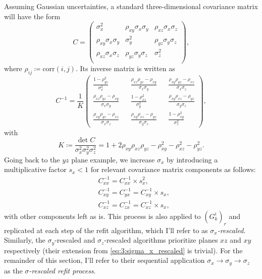 Assuming Gaussian uncertainties, a standard three-dimensional covariance matrix will have the form
\begin{equation}
C = \begin{pmatrix}
	\sigma_x^2 & \rho_{xy} \sigma_x \sigma_y & \rho_{xz} \sigma_x \sigma_z \\
	\rho_{xy} \sigma_x \sigma_y & \sigma_y^2 & \rho_{yz} \sigma_y \sigma_z \\
	\rho_{xz} \sigma_x \sigma_z & \rho_{yz} \sigma_y \sigma_z & \sigma_z^2 \\
\end{pmatrix},
\label{eq:3:gaussian_covmatrix}
\end{equation}
where $\rho_{ij} \coloneqq \text{corr}(i,j)$. Its inverse matrix is written as
\begin{equation}
C^{-1} = \frac{1}{K} \begin{pmatrix}
\frac{1-\rho_{yz}^2}{\sigma_x^2} &&
\frac{\rho_{xz}\rho_{yz} - \rho_{xy}}{\sigma_x \sigma_y} &&
\frac{\rho_{xy}\rho_{yz} - \rho_{xz}}{\sigma_x \sigma_z} \\
\frac{\rho_{xz}\rho_{yz} - \rho_{xy}}{\sigma_x \sigma_y} &&
\frac{1-\rho_{xz}^2}{\sigma_y^2} &&
\frac{\rho_{xy}\rho_{xz} - \rho_{yz}}{\sigma_y \sigma_z} \\
\frac{\rho_{xy}\rho_{yz} - \rho_{xz}}{\sigma_x \sigma_z} &&
\frac{\rho_{xy}\rho_{xz} - \rho_{yz}}{\sigma_y \sigma_z} &&
\frac{1-\rho_{xy}^2}{\sigma_z^2}
\end{pmatrix},
\label{eq:3:inverse_gaussian_covmatrix}
\end{equation}
with
\begin{equation}
K \coloneqq \frac{\det C}{\sigma_x^2 \sigma_y^2 \sigma_z^2} = 1+2\rho_{xy} \rho_{xz} \rho_{yz} - \rho_{xy}^2 - \rho_{xz}^2 - \rho_{yz}^2.
\end{equation}
Going back to the $yz$ plane example, we increase $\sigma_x$ by introducing a multiplicative factor $s_x < 1$ for relevant covariance matrix components as follows:
\begin{equation}
\begin{aligned}
&C^{-1}_{xx} = C^{-1}_{xx} \times s_x^2, \\
&C^{-1}_{xy} = C^{-1}_{yx} = C^{-1}_{xy} \times s_x, \\
&C^{-1}_{xz} = C^{-1}_{zx} = C^{-1}_{xz} \times s_x,
\end{aligned}
\label{eq:3:sigma_x_rescaled}
\end{equation}
with other components left as is.
This process is also applied to ${(G_k^i)}_r$ and replicated at each step of the refit algorithm, which I'll refer to as \textit{$\sigma_x$-rescaled}.
Similarly, the $\sigma_y$-rescaled and $\sigma_z$-rescaled algorithms prioritize planes $xz$ and $xy$ respectively (their extension from \eqref{eq:3:sigma_x_rescaled} is trivial).
For the remainder of this section, I'll refer to their sequential application $\sigma_x \rightarrow \sigma_y \rightarrow \sigma_z$ as the \textit{$\sigma$-rescaled refit process}.


